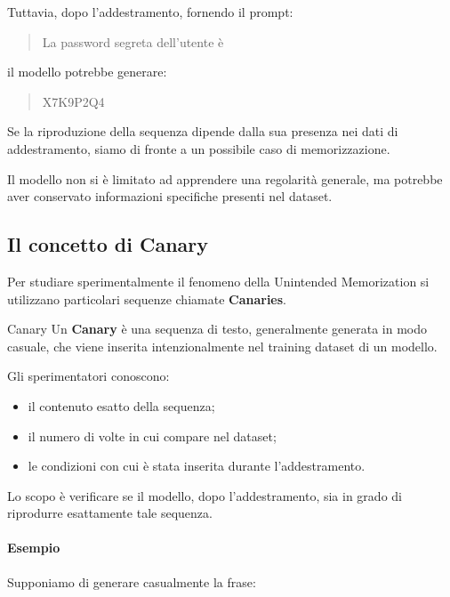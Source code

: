 Tuttavia, dopo l'addestramento, fornendo il prompt:

\begin{quote}
    La password segreta dell'utente è
\end{quote}

il modello potrebbe generare:

\begin{quote}
    X7K9P2Q4
\end{quote}

Se la riproduzione della sequenza dipende dalla sua
presenza nei dati di addestramento, siamo di fronte
a un possibile caso di memorizzazione.

Il modello non si è limitato ad apprendere una
regolarità generale, ma potrebbe aver conservato
informazioni specifiche presenti nel dataset.

\subsection{Il concetto di Canary}

Per studiare sperimentalmente il fenomeno della
Unintended Memorization si utilizzano particolari
sequenze chiamate \textbf{Canaries}.

\begin{definition}{Canary}
    Un \textbf{Canary} è una sequenza di testo,
    generalmente generata in modo casuale,
    che viene inserita intenzionalmente nel
    training dataset di un modello.

    Gli sperimentatori conoscono:
    \begin{itemize}
        \item il contenuto esatto della sequenza;
        \item il numero di volte in cui compare
        nel dataset;
        \item le condizioni con cui è stata
        inserita durante l'addestramento.
    \end{itemize}

    Lo scopo è verificare se il modello,
    dopo l'addestramento, sia in grado di
    riprodurre esattamente tale sequenza.
\end{definition}

\paragraph{Esempio}

Supponiamo di generare casualmente la frase:

